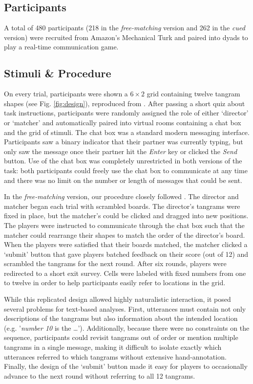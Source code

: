 \documentclass[alpha-refs]{wiley-article}
\begin{document}
\subsection{Participants}\label{participants}

A total of 480 participants (218 in the \emph{free-matching} version and 262 in the \emph{cued} version) were recruited from Amazon's Mechanical Turk and paired into dyads to play a real-time communication game.

\subsection{Stimuli \& Procedure}\label{stimuli}

On every trial, participants were shown a \(6 \times 2\) grid containing twelve tangram shapes (see Fig. \ref{fig:design}), reproduced from \cite{ClarkWilkesGibbs86_ReferringCollaborative}.
After passing a short quiz about task instructions, participants were randomly assigned the role of either `director' or `matcher' and automatically paired into virtual rooms containing a chat box and the grid of stimuli.
The chat box was a standard modern messaging interface. 
Participants saw a binary indicator that their partner was currently typing, but only saw the message once their partner hit the \emph{Enter} key or clicked the \emph{Send} button.
Use of the chat box was completely unrestricted in both versions of the task: both participants could freely use the chat box to communicate at any time and there was no limit on the number or length of messages that could be sent.

In the \emph{free-matching} version, our procedure closely followed \cite{ClarkWilkesGibbs86_ReferringCollaborative}.
The director and matcher began each trial with scrambled boards.
The director's tangrams were fixed in place, but the matcher's could be clicked and dragged into new positions.
The players were instructed to communicate through the chat box such that the matcher could rearrange their shapes to match the order of the director's board.
When the players were satisfied that their boards matched, the matcher clicked a `submit' button that gave players batched feedback on their score (out of 12) and scrambled the tangrams for the next round.
After six rounds, players were redirected to a short exit survey.
Cells were labeled with fixed numbers from one to twelve in order to help participants easily refer to locations in the grid.

While this replicated design allowed highly naturalistic interaction, it posed several problems for text-based analyses.
First, utterances must contain not only descriptions of the tangrams but also information about the intended location (e.g. '\emph{number 10} is the \dots').
Additionally, because there were no constraints on the sequence, participants could revisit tangrams out of order or mention multiple tangrams in a single message, making it difficult to isolate exactly which utterances referred to which tangrams without extensive hand-annotation.
Finally, the design of the `submit' button made it easy for players to occasionally advance to the next round without referring to all 12 tangrams.
\end{document}
